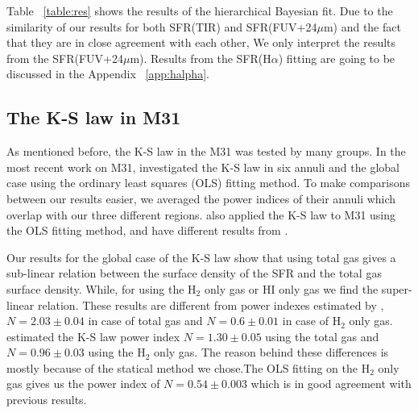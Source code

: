 \documentclass[useAMS,usenatbib]{mn2e}
\begin{document}


Table ~\ref{table:res} shows the results of the hierarchical Bayesian fit. Due to the similarity of our results for both SFR(TIR) and SFR(FUV+24$\mu$m) and the fact that they are in close agreement with each other, 
We only interpret the results from the SFR(FUV+24$\mu$m). Results from the SFR(H$\alpha$) fitting are going to be discussed in the Appendix ~\ref{app:halpha}.
\subsection{The K-S law in M31}

As mentioned before, the K-S law in the M31 was tested by many groups. %
In the most recent work on M31, \cite{Ford13} investigated the K-S law in six annuli and the global case using the ordinary least squares (OLS) fitting method. To make comparisons between our results easier, we averaged the power indices of their annuli which overlap with our three different regions. \cite{Tabatabaei10} also applied the K-S law to M31 using the OLS fitting method, and have different results from \cite{Ford13}.

Our results for the global case of the K-S law show that using total gas gives a sub-linear relation between the surface density of the SFR and the total gas surface density. While, for using the H$_{2}$ only gas or HI only gas we find the super-linear relation. These results are different from power indexes estimated by \cite{Ford13}, $N=2.03\pm0.04$ in case of total gas and $N=0.6\pm0.01$ in case of H$_{2}$ only gas. \cite{Tabatabaei10} estimated the K-S law power index $N=1.30\pm0.05$ using the total gas and $N=0.96\pm0.03$ using the H$_{2}$ only gas. The reason behind these differences is mostly because of the statical method we chose.The OLS fitting on the H$_{2}$ only gas gives us the power index of $N=0.54\pm0.003$ which is in good agreement with previous results.
\end{document}
